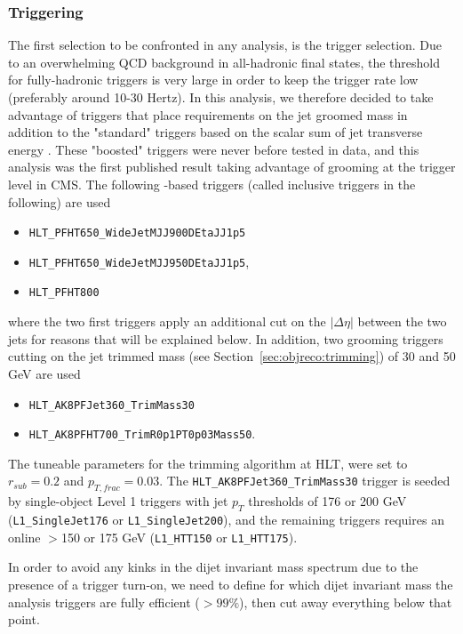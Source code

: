 \subsubsection{Triggering}
The first selection to be confronted in any analysis, is the trigger selection. Due to an overwhelming QCD background in all-hadronic final states, the threshold for fully-hadronic triggers is very large in order to keep the trigger rate low (preferably around 10-30 Hertz). In this analysis, we therefore decided to take advantage of triggers that place requirements on the jet groomed mass in addition to the "standard" triggers based on the scalar sum of jet transverse energy \HT. These "boosted" triggers were never before tested in data, and this analysis was the first published result taking advantage of grooming at the trigger level in CMS. The following \HT-based triggers (called inclusive triggers in the following) are used
\begin{itemize}
\item \texttt{HLT\_PFHT650\_WideJetMJJ900DEtaJJ1p5}
\item \texttt{HLT\_PFHT650\_WideJetMJJ950DEtaJJ1p5},
\item \texttt{HLT\_PFHT800}
\end{itemize}
where the two first triggers apply an additional cut on the $|\Delta \eta|$ between the two jets for reasons that will be explained below. In addition, two grooming triggers cutting on the jet trimmed mass (see Section~\ref{sec:objreco:trimming}) of 30 and 50 GeV are used
\begin{itemize}
\item \texttt{HLT\_AK8PFJet360\_TrimMass30}
\item \texttt{HLT\_AK8PFHT700\_TrimR0p1PT0p03Mass50}.
\end{itemize}
The tuneable parameters for the trimming algorithm at HLT, were set to $r_{sub}=0.2$ and $p_{T,frac}=0.03$. The \texttt{HLT\_AK8PFJet360\_TrimMass30} trigger is seeded by single-object Level 1 triggers with jet $p_T$ thresholds of 176 or 200 GeV (\texttt{L1\_SingleJet176} or \texttt{L1\_SingleJet200}), and the remaining triggers requires an online \HT{}$>$150 or 175 GeV (\texttt{L1\_HTT150} or \texttt{L1\_HTT175}).\par

In order to avoid any kinks in the dijet invariant mass spectrum due to the presence of a trigger turn-on, we need to define for which dijet invariant mass the analysis triggers are fully efficient ($>99\%$), then cut away everything below that point.

